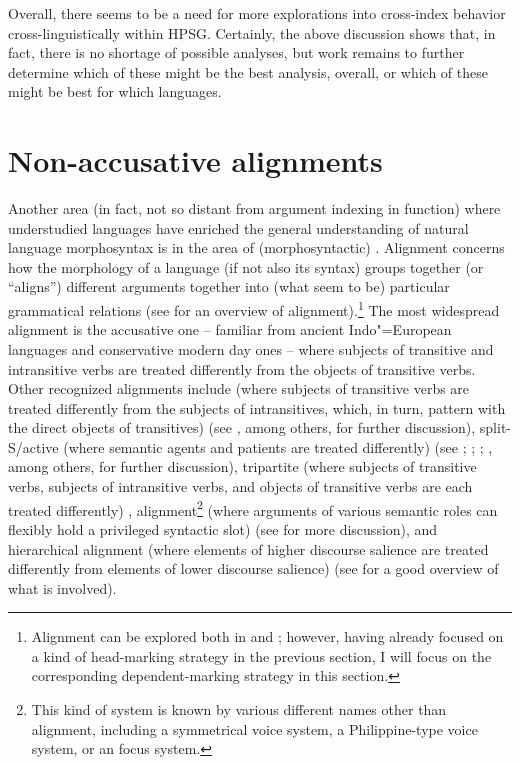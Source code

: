 \documentclass[output=paper
	        ,collection
	        ,collectionchapter
 	        ,biblatex
                ,babelshorthands
                ,newtxmath
                ,draftmode
                ,colorlinks, citecolor=brown
]{langscibook}
\begin{document}
Overall, there seems to be a need for more explorations into cross-index behavior cross-linguistically within HPSG. Certainly, the above discussion shows that, in fact, there is no shortage of possible analyses, but work remains to further determine which of these might be the best analysis, overall, or which of these might be best for which languages.

\section{Non-accusative alignments}

Another area (in fact, not so distant from argument indexing in function) where understudied languages have enriched the general understanding of natural language morphosyntax is in the area of (morphosyntactic) . Alignment concerns how the morphology of a language (if not also its syntax) groups together (or ``aligns'') different arguments together into (what seem to be) particular grammatical relations (see \citealt{bicknich09} for an overview of alignment).\footnote{Alignment can be explored both in  and  \citep{Nichols86a-u}; however, having already focused on a kind of head-marking strategy in the previous section, I will focus on the corresponding dependent-marking strategy in this section.} The most widespread alignment is the accusative one -- familiar from ancient Indo"=European languages and conservative modern day ones -- where subjects of transitive and intransitive verbs are treated differently from the objects of transitive verbs. Other recognized alignments include  (where subjects of transitive verbs are treated differently from the subjects of intransitives, which, in turn, pattern with the direct objects of transitives) (see \citealt{comrie78erg,plank79,dixon79,dixon94}, among others, for further discussion), split-S/active (where semantic agents and patients are treated differently) (see \citealt{klimov73,klimov74}; \citealt[Chapter 4]{dixon94}; \citealt{mithun91}; \citealt{wichdon08}, among others, for further discussion), tripartite (where subjects of transitive verbs, subjects of intransitive verbs, and objects of transitive verbs are each treated differently) \citep[39--40]{dixon94},  alignment\footnote{This kind of system is known by various different names other than  alignment, including a symmetrical voice system, a Philippine-type voice system, or an  focus system.} (where arguments of various semantic roles can flexibly hold a privileged syntactic slot) (see \citealt{schachter76,ross02,himmelmann05typchar} for more discussion), and hierarchical alignment (where elements of higher discourse salience are treated differently from elements of lower discourse salience) (see \citealt{jacqant14} for a good overview of what is involved).    
\end{document}
